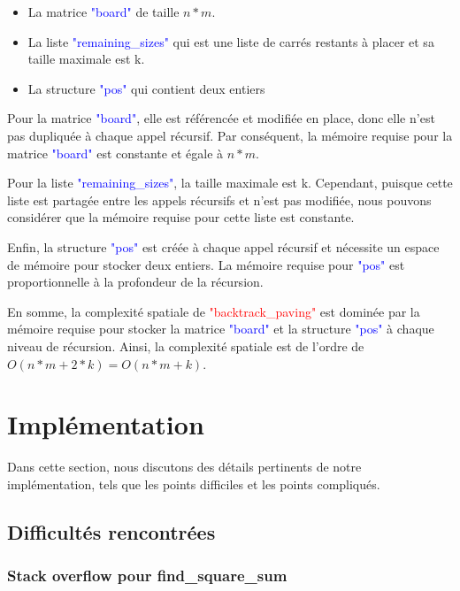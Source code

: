 \documentclass{article}
\begin{document}
\begin{itemize}
  \item La matrice \textcolor{blue}{"board"} de taille $n * m$.
  \item La liste \textcolor{blue}{"remaining\_sizes"} qui est une liste de carrés restants à placer et sa taille maximale est k.
  \item La structure \textcolor{blue}{"pos"} qui contient deux entiers\newline
\end{itemize}

Pour la matrice \textcolor{blue}{"board"}, elle est référencée et modifiée en place, donc elle n'est pas dupliquée à chaque appel récursif. Par conséquent, la mémoire requise pour la matrice \textcolor{blue}{"board"} est constante et égale à $n * m$.\newline

Pour la liste \textcolor{blue}{"remaining\_sizes"}, la taille maximale est k. Cependant, puisque cette liste est partagée entre les appels récursifs et n'est pas modifiée, nous pouvons considérer que la mémoire requise pour cette liste est constante.\newline

Enfin, la structure \textcolor{blue}{"pos"} est créée à chaque appel récursif et nécessite un espace de mémoire pour stocker deux entiers. La mémoire requise pour \textcolor{blue}{"pos"} est proportionnelle à la profondeur de la récursion.\newline

En somme, la complexité spatiale de \textcolor{red}{"backtrack\_paving"} est dominée par la mémoire requise pour stocker la matrice \textcolor{blue}{"board"} et la structure \textcolor{blue}{"pos"} à chaque niveau de récursion. Ainsi, la complexité spatiale est de l'ordre de $O(n * m + 2 * k) = O(n * m + k)$.

\section{Implémentation}

Dans cette section, nous discutons des détails pertinents de notre implémentation, tels que les points difficiles et les points compliqués.

\subsection{Difficultés rencontrées }
\subsubsection{Stack overflow pour find\_square\_sum }
\end{document}
